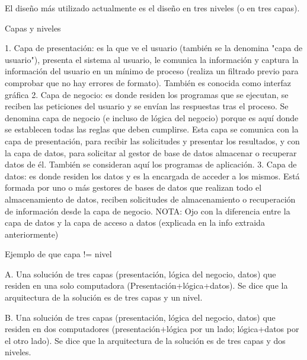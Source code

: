 El diseño más utilizado actualmente es el diseño en tres niveles (o en tres capas).

Capas y niveles

1. Capa de presentación: es la que ve el usuario (también se la denomina "capa de usuario"), presenta el sistema al usuario, le comunica 
la información y captura la información del usuario en un mínimo de proceso (realiza un filtrado previo para comprobar que no hay errores 
de formato). También es conocida como interfaz gráfica 
2. Capa de negocio: es donde residen los programas que se ejecutan, se reciben las peticiones del usuario y se envían las respuestas tras 
el proceso. Se denomina capa de negocio (e incluso de lógica del negocio) porque es aquí donde se establecen todas las reglas que deben 
cumplirse. Esta capa se comunica con la capa de presentación, para recibir las solicitudes y presentar los resultados, y con la capa de 
datos, para solicitar al gestor de base de datos almacenar o recuperar datos de él. También se consideran aquí los programas de aplicación.
3. Capa de datos: es donde residen los datos y es la encargada de acceder a los mismos. Está formada por uno o más gestores de bases de 
datos que realizan todo el almacenamiento de datos, reciben solicitudes de almacenamiento o recuperación de información desde la capa de 
negocio.
NOTA: Ojo con la diferencia entre la capa de datos y la capa de acceso a datos (explicada en la info extraida anteriormente)

Ejemplo de que capa != nivel

A. Una solución de tres capas (presentación, lógica del negocio, datos) que residen en una solo computadora (Presentación+lógica+datos). 
Se dice que la arquitectura de la solución es de tres capas y un nivel.

B. Una solución de tres capas (presentación, lógica del negocio, datos) que residen en dos computadores (presentación+lógica por un 
lado; lógica+datos por el otro lado). Se dice que la arquitectura de la solución es de tres capas y dos niveles. 


